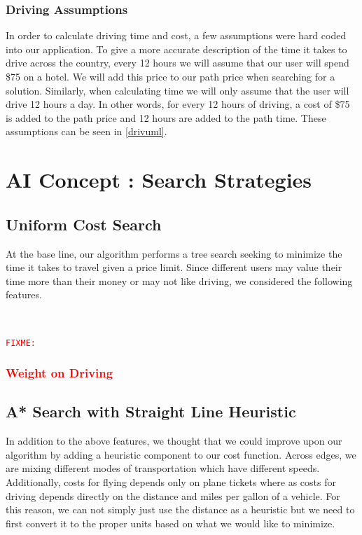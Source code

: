 \documentclass[11pt]{article}
\newcommand{\FIXME}[1]{ \ \\ \hspace* {-1.5 cm}
  \textcolor{red}{\texttt{FIXME:}#1} \medskip\par}
\begin{document}
\subsubsection{Driving Assumptions}

In order to calculate driving time and cost, a few assumptions were hard coded into our application. To give a more accurate description of the time it takes to drive across the country, every 12 hours we will assume that our user will spend \$75 on a hotel. We will add this price to our path price when searching for a solution. Similarly, when calculating time we will only assume that the user will drive 12 hours a day. In other words, for every 12 hours of driving, a cost of \$75 is added to the path price and 12 hours are added to the path time. These assumptions can be seen in \ref{drivuml}.



\section{AI Concept : Search Strategies}\label{sec:search}

\subsection{Uniform Cost Search}

At the base line, our algorithm performs a tree search seeking to minimize the time it takes to travel given a price limit. 
Since different users may value their time more than their money or may not like driving, we considered the following features.

\FIXME{\subsubsection{Weight on Driving}}

\subsection{A* Search with Straight Line Heuristic}

In addition to the above features, we thought that we could improve upon our algorithm by adding a heuristic component to our cost function. 
Across edges, we are mixing different modes of transportation which have different speeds. Additionally, costs for flying depends only on plane tickets where as costs for driving depends directly on the distance and miles per gallon of a vehicle. 
For this reason, we can not simply just use the distance as a heuristic but we need to first convert it to the proper units based on what we would like to minimize.
\end{document}
